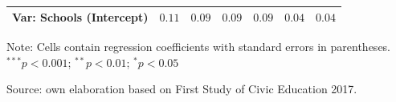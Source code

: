 \documentclass[
  12pt,
  letterpaper,
]{article}
\begin{document}
\begin{table}
{\begin{center}
{\begin{threeparttable}
\begin{tabular}{l c c c c c c}
Var: Schools (Intercept)                               & $0.11$        & $0.09$        & $0.09$        & $0.09$        & $0.04$        & $0.04$        \\
\bottomrule
\end{tabular}
\begin{tablenotes}[flushleft]
\scriptsize{\item Note: Cells contain regression coefficients with standard errors in parentheses. $^{***}p<0.001$; $^{**}p<0.01$; $^{*}p<0.05$ \\ \item Source: own elaboration based on First Study of Civic Education 2017.}
\end{tablenotes}
\end{threeparttable}
}
\caption{}
\label{table:coefficients}
\end{center}

}

\end{table}%
\end{document}
